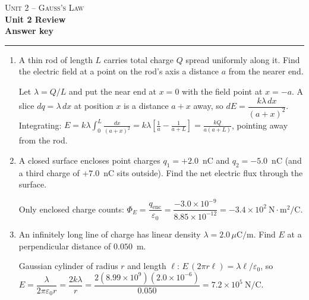 \documentclass[11pt,letterpaper]{article}
\begin{document}
{\small\textsc{Unit 2 -- Gauss's Law}}\\[2pt]{\Large\bfseries Unit 2 Review}\\[8pt]\textbf{Answer key}\\[4pt]\hrule\vspace{10pt}{\small\itshape Placeholder worksheet for the site prototype. Free for classroom use.}\vspace{6pt}
\begin{enumerate}[leftmargin=*,itemsep=10pt]
\item A thin rod of length $L$ carries total charge $Q$ spread uniformly along it. Find the electric field at a point on the rod's axis a distance $a$ from the nearer end.
\begin{answer}Let $\lambda = Q/L$ and put the near end at $x=0$ with the field point at $x=-a$. A slice $dq = \lambda\,dx$ at position $x$ is a distance $a + x$ away, so $dE = \dfrac{k\lambda\,dx}{(a+x)^2}$. Integrating: $E = k\lambda\displaystyle\int_0^{L}\frac{dx}{(a+x)^2} = k\lambda\left[\frac{1}{a} - \frac{1}{a+L}\right] = \frac{kQ}{a(a+L)}$, pointing away from the rod.\end{answer}
\item A closed surface encloses point charges $q_1 = +2.0$~nC and $q_2 = -5.0$~nC (and a third charge of $+7.0$~nC sits outside). Find the net electric flux through the surface.
\begin{answer}Only enclosed charge counts: $\Phi_E = \dfrac{q_{\text{enc}}}{\varepsilon_0} = \dfrac{-3.0\times10^{-9}}{8.85\times10^{-12}} = -3.4\times10^{2}\ \text{N}\cdot\text{m}^2/\text{C}$.\end{answer}
\item An infinitely long line of charge has linear density $\lambda = 2.0\,\mu\text{C/m}$. Find $E$ at a perpendicular distance of $0.050$~m.
\begin{answer}Gaussian cylinder of radius $r$ and length $\ell$: $E\,(2\pi r\ell) = \lambda\ell/\varepsilon_0$, so $E = \dfrac{\lambda}{2\pi\varepsilon_0 r} = \dfrac{2k\lambda}{r} = \dfrac{2(8.99\times10^{9})(2.0\times10^{-6})}{0.050} = 7.2\times10^{5}\ \text{N/C}$.\end{answer}
\end{enumerate}
\end{document}
